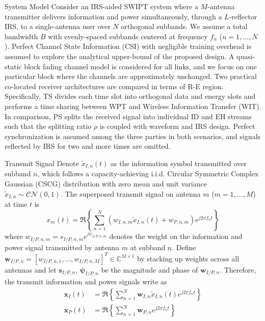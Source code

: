 \documentclass{IEEEtran}
\begin{document}
\begin{section}{System Model}
	Consider an IRS-aided SWIPT system where a $M$-antenna transmitter delivers information and power simultaneously, through a $L$-reflector IRS, to a single-antenna user over $N$ orthogonal subbands. We assume a total bandwidth $B$ with evenly-spaced subbands centered at frequency $f_n$ ($n=1,\dots,N$). Perfect Channel State Information (CSI) with negligible training overhead is assumed to explore the analytical upper-bound of the proposed design. A quasi-static block fading channel model is considered for all links, and we focus on one particular block where the channels are approximately unchanged. Two practical co-located receiver architectures are compared in terms of R-E region. Specifically, TS divides each time slot into orthogonal data and energy slots and performs a time sharing between WPT and Wireless Information Transfer (WIT). In comparison, PS splits the received signal into individual ID and EH streams such that the splitting ratio $\rho$ is coupled with waveform and IRS design. Perfect synchronization is assumed among the three parties in both scenarios, and signals reflected by IRS for two and more times are omitted.
	\begin{subsection}{Transmit Signal}
		Denote $\tilde{x}_{I,n}(t)$ as the information symbol transmitted over subband $n$, which follows a capacity-achieving i.i.d. Circular Symmetric Complex Gaussian (CSCG) distribution with zero mean and unit variance $\tilde{x}_{I,n}\sim\mathcal{CN}(0,1)$. The superposed transmit signal on antenna $m$ ($m=1,\dots,M$) at time $t$ is
		\begin{equation}\label{eq:x_m}
			x_m(t)=\Re\left\{\sum_{n=1}^N\left({w_{I,n,m}\tilde{x}_{I,n}(t)}+w_{P,n,m}\right){e^{j2{\pi}{f_n}{t}}}\right\}
		\end{equation}
		where $w_{I/P,n,m}=s_{I/P,n,m}e^{j\psi_{I/P,n,m}}$ denotes the weight on the information and power signal transmitted by antenna $m$ at subband $n$. Define $\boldsymbol{w}_{I/P,n}=[w_{I/P,n,1},\dots,w_{I/P,n,M}]^T \in \mathbb{C}^{M \times 1}$ by stacking up weights across all antennas and let $\boldsymbol{s}_{I/P,n}$, $\boldsymbol{\psi}_{I/P,n}$ be the magnitude and phase of $\boldsymbol{w}_{I/P,n}$. Therefore, the transmit information and power signals write as
		\begin{align}
			\boldsymbol{x}_{I}(t) &= \Re{\left\{\sum_{n=1}^N\boldsymbol{w}_{I,n}\tilde{x}_{I,n}(t){e^{j2{\pi}{f_n}{t}}}\right\}}\label{eq:x_I}\\
			\boldsymbol{x}_{P}(t) &= \Re{\left\{\sum_{n=1}^N\boldsymbol{w}_{P,n}{e^{j2{\pi}{f_n}{t}}}\right\}}\label{eq:x_P}
		\end{align}


\end{subsection}
\end{section}
\end{document}
